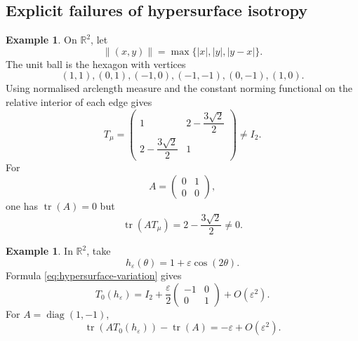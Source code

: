 \documentclass[11pt,a4paper]{amsart}
\numberwithin{equation}{section}
\theoremstyle{plain}
\theoremstyle{definition}
\newtheorem{example}[theorem]{Example}
\theoremstyle{remark}
\DeclareMathOperator{\tr}{tr}
\newcommand{\R}{\mathbb{R}}
\newcommand{\Id}{I}
\newcommand{\norm}[1]{\left\|#1\right\|}
\begin{document}
\subsection{Explicit failures of hypersurface isotropy}

\begin{example}\label{ex:hexagon}
On $\R^2$, let
\[
\norm{(x,y)}=\max\{|x|,|y|,|y-x|\}.
\]
The unit ball is the hexagon with vertices
\[
(1,1),(0,1),(-1,0),(-1,-1),(0,-1),(1,0).
\]
Using normalised arclength measure and the constant norming functional on the relative interior of each edge gives
\begin{equation}\label{eq:hexagon-tensor}
T_{\mu}
=\begin{pmatrix}
1&2-\dfrac{3\sqrt2}{2}\\[3pt]
2-\dfrac{3\sqrt2}{2}&1
\end{pmatrix}\neq\Id_2.
\end{equation}
For
\[
A=\begin{pmatrix}0&1\\0&0\end{pmatrix},
\]
one has $\tr(A)=0$ but
\[
\tr(AT_\mu)=2-\frac{3\sqrt2}{2}\neq0.
\]
\end{example}

\begin{example}\label{ex:smooth}
In $\R^2$, take
\[
h_\varepsilon(\theta)=1+\varepsilon\cos(2\theta).
\]
Formula \eqref{eq:hypersurface-variation} gives
\begin{equation}\label{eq:smooth-example}
T_0(h_\varepsilon)
=\Id_2+\frac\varepsilon2
\begin{pmatrix}-1&0\\0&1\end{pmatrix}
+O(\varepsilon^2).
\end{equation}
For $A=\operatorname{diag}(1,-1)$,
\[
\tr(AT_0(h_\varepsilon))-\tr(A)
=-\varepsilon+O(\varepsilon^2).
\]
\end{example}
\end{document}
